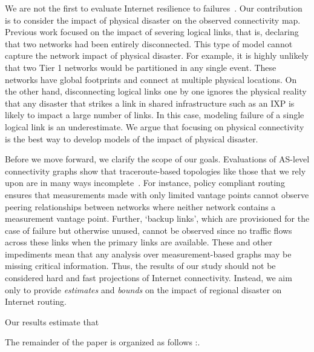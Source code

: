We are not the first to evaluate Internet resilience to
failures~\cite{michigan, measuringresilience, resilience-under-BGP,
resilience-complex-networks}.  Our contribution is to consider the impact of physical
disaster on the observed connectivity map.  Previous work focused on
the impact of severing logical links, that is, declaring that two networks had
been entirely disconnected.  This type of model cannot capture the network impact
of physical disaster.  For example, it is highly unlikely that two Tier
1 networks would be partitioned in any single event.  These networks have
global footprints and connect at multiple physical locations.
  On the other hand, disconnecting logical links
one by one ignores the physical reality that any disaster that strikes a link
in shared infrastructure such as an IXP is likely to impact a large number of
links.  In this case, modeling failure of a single logical link is an
underestimate.  We argue that focusing on physical connectivity is the best way to
develop models of the impact of physical disaster. 


Before we move forward, we clarify the scope of our goals.  
Evaluations of AS-level connectivity graphs show that traceroute-based
topologies like those that we rely upon are in many ways
incomplete~\cite{walter}.  For instance, policy compliant routing ensures that
measurements made with only limited vantage points cannot observe peering
relationships between networks where neither network contains a measurement
vantage point.  Further, `backup links', which are provisioned for the case of
failure but otherwise unused, cannot be observed since no traffic flows across
these links when the primary links are available.  These and other impediments
mean that any analysis over measurement-based graphs may be missing critical
information.  Thus, the results of our study should not be considered hard and
fast projections of Internet connectivity.  Instead, we aim only to provide
{\it estimates} and {\it bounds} on the impact of regional disaster on Internet
routing.

Our results estimate that \justine{\ldots}

The remainder of the paper is organized as follows \justine{\ldots}:.


